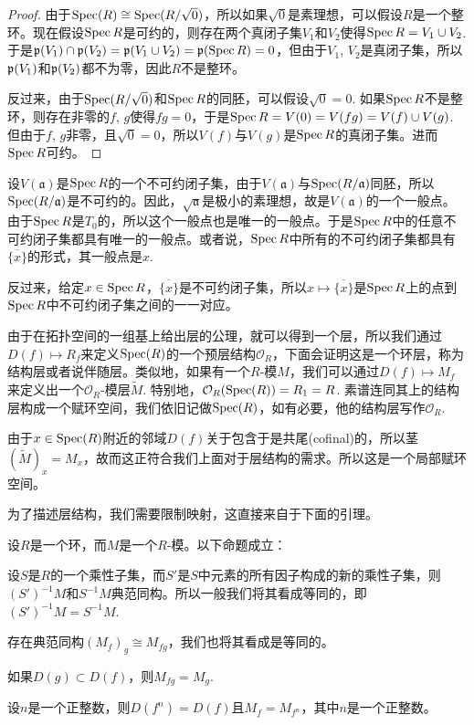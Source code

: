 \begin{proof}
由于$\operatorname{Spec}(R)\cong \operatorname{Spec}(R/\sqrt{0})$，所以如果$\sqrt{0}$是素理想，可以假设$R$是一个整环。现在假设$\operatorname{Spec} R$是可约的，则存在两个真闭子集$V_1$和$V_2$使得$\operatorname{Spec} R=V_1\cup V_2$. 于是$\mathfrak{p}(V_1)\cap \mathfrak{p}(V_2)=\mathfrak{p}(V_1\cup V_2)=\mathfrak{p} (\operatorname{Spec} R)=0$，但由于$V_1$, $V_2$是真闭子集，所以$\mathfrak{p}(V_1)$和$\mathfrak{p}(V_2)$都不为零，因此$R$不是整环。

反过来，由于$\operatorname{Spec}(R/\sqrt{0})$和$\operatorname{Spec} R$的同胚，可以假设$\sqrt{0}=0$. 如果$\operatorname{Spec} R$不是整环，则存在非零的$f$, $g$使得$fg=0$，于是$\operatorname{Spec} R=V(0)=V(fg)=V(f)\cup V(g)$. 但由于$f$, $g$非零，且$\sqrt{0}=0$，所以$V(f)$与$V(g)$是$\operatorname{Spec} R$的真闭子集。进而$\operatorname{Spec} R$可约。
\end{proof}

设$V(\mathfrak{a})$是$\operatorname{Spec} R$的一个不可约闭子集，由于$V(\mathfrak{a})$与$\operatorname{Spec} (R/\mathfrak{a})$同胚，所以$\operatorname{Spec} (R/\mathfrak{a})$是不可约的。因此，$\sqrt{\mathfrak{a}}$是极小的素理想，故是$V(\mathfrak{a})$的一个一般点。由于$\operatorname{Spec} R$是$T_0$的，所以这个一般点也是唯一的一般点。于是$\operatorname{Spec} R$中的任意不可约闭子集都具有唯一的一般点。或者说，$\operatorname{Spec} R$中所有的不可约闭子集都具有$\overline{\{x\}}$的形式，其一般点是$x$. 

反过来，给定$x\in\operatorname{Spec} R$，$\overline{\{x\}}$是不可约闭子集，所以$x\mapsto \overline{\{x\}}$是$\operatorname{Spec} R$上的点到$\operatorname{Spec} R$中不可约闭子集之间的一一对应。

\begin{para}
由于在拓扑空间的一组基上给出层的公理，就可以得到一个层，所以我们通过$D(f)\mapsto R_f$来定义$\operatorname{Spec}(R)$的一个预层结构$\mathcal{O}_R$，下面会证明这是一个环层，称为结构层或者说伴随层。类似地，如果有一个$R$-模$M$，我们可以通过$D(f)\mapsto M_f$来定义出一个$\mathcal{O}_R$-模层$\widetilde{M}$. 特别地，$\mathcal{O}_R(\operatorname{Spec}(R))=R_1=R$. 素谱连同其上的结构层构成一个赋环空间，我们依旧记做$\operatorname{Spec}(R)$，如有必要，他的结构层写作$\mathcal{O}_R$.

由于$x\in \operatorname{Spec}(R)$附近的邻域$D(f)$关于包含于是共尾(cofinal)的，所以茎$(\widetilde{M})_x=M_x$，故而这正符合我们上面对于层结构的需求。所以这是一个局部赋环空间。
\end{para}

为了描述层结构，我们需要限制映射，这直接来自于下面的引理。

\begin{lem}
设$R$是一个环，而$M$是一个$R$-模。以下命题成立：
\begin{compactenum}[~~~1.]
\item 设$S$是$R$的一个乘性子集，而$S'$是$S$中元素的所有因子构成的新的乘性子集，则$(S')^{-1}M$和$S^{-1}M$典范同构。所以一般我们将其看成等同的，即$(S')^{-1}M=S^{-1}M$. 
\item 存在典范同构$(M_f)_g\cong M_{fg}$，我们也将其看成是等同的。
\item 如果$D(g)\subset D(f)$，则$M_{fg}=M_{g}$.
\item 设$n$是一个正整数，则$D(f^n)=D(f)$且$M_{f}=M_{f^n}$，其中$n$是一个正整数。
\end{compactenum}
\end{lem}

